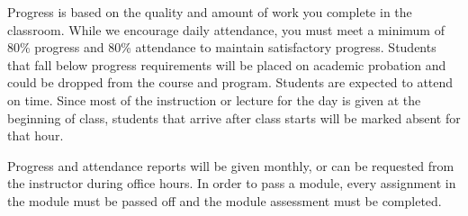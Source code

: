 Progress is based on the quality and amount of work you complete in the classroom. While we
encourage daily attendance, you must meet a minimum of 80\% progress and 80\% attendance to
maintain satisfactory progress. Students that fall below progress requirements will be placed on
academic probation and could be dropped from the course and program. Students are expected to attend
on time. Since most of the instruction or lecture for the day is given at the beginning of class,
students that arrive after class starts will be marked absent for that hour.
\par
\bigskip
Progress and attendance reports will be given monthly, or can be requested from the instructor during
office hours. In order to pass a module, every assignment in the module must be passed off and the
module assessment must be completed.
